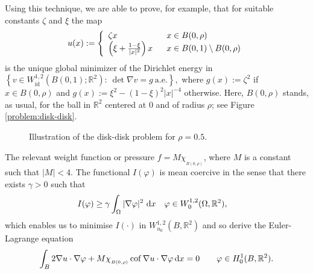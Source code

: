\documentclass[12pt]{amsart}
\newcommand{\md}{{\rm d}}
\newcommand{\dx}{\, \md x}
\newcommand{\R}{\mathbb{R}}
\newcommand{\om}{\Omega}
\newcommand{\cof}{{\rm cof}\,}
\newcommand{\1}{{\bf 1}}
\begin{document}
Using this technique, we are able to prove, for example, that for suitable constants $\zeta$ and $\xi$ the map 
\begin{align}\label{examplediskdisk}
    u(x):=\left\{\begin{array}{l l} \zeta x & \ \ x \in B(0,\rho) \\
    \left(\xi+\frac{1-\xi}{|x|^2}\right)x & \ \ x \in B(0,1)\setminus B(0,\rho) \end{array}\right.
    \end{align}
is the unique global minimizer of the Dirichlet energy in 
 $   \left\{v \in W_{\textrm{id}}^{1,2}(B(0,1);\R^2): \ \det \nabla v = g \ \textrm{a.e.}\right\}, $
where $g(x):=\zeta^2$ if $x\in B(0,\rho)$ and $g(x):=\xi^2-(1-\xi)^2 |x|^{-4}$ otherwise.  Here, $B(0,\rho)$ stands, as usual, for the ball in $\R^2$ centered at $0$ and of radius $\rho$; see Figure \eqref{problem:disk-disk}. 

\begin{figure}[H]
\centering
\begin{minipage}{1\textwidth}
\centering
{}
\end{minipage}
\caption{Illustration of the disk-disk problem for $\rho = 0.5$.}
\label{problem:disk-disk}
\end{figure}







The relevant weight function or pressure $f=M\chi_{_{B(0,\rho)}}$, where $M$ is a constant such that $|M|<4$.  The functional $I(\varphi)$ is mean coercive in the sense that there exists $\gamma>0$ such that 
\begin{align*}
    I(\varphi) & \geq \gamma \int_{\om}|\nabla \varphi|^2 \, \dx \quad \varphi \in W_0^{1,2}(\om,\R^2),
\end{align*}
which enables us to minimise $I(\cdot)$ in $W_{u_{0}}^{1,2}(B,\R^2)$ and so derive the Euler-Lagrange equation
\begin{align}\label{eltest}
    \int_{B}2\nabla u \cdot \nabla \varphi + M\chi_{_{B(0,\rho)}}\, \cof\nabla u\cdot \nabla\varphi \dx = 0 \quad \quad \varphi \in H^1_0(B,\R^2).
\end{align}
\end{document}
